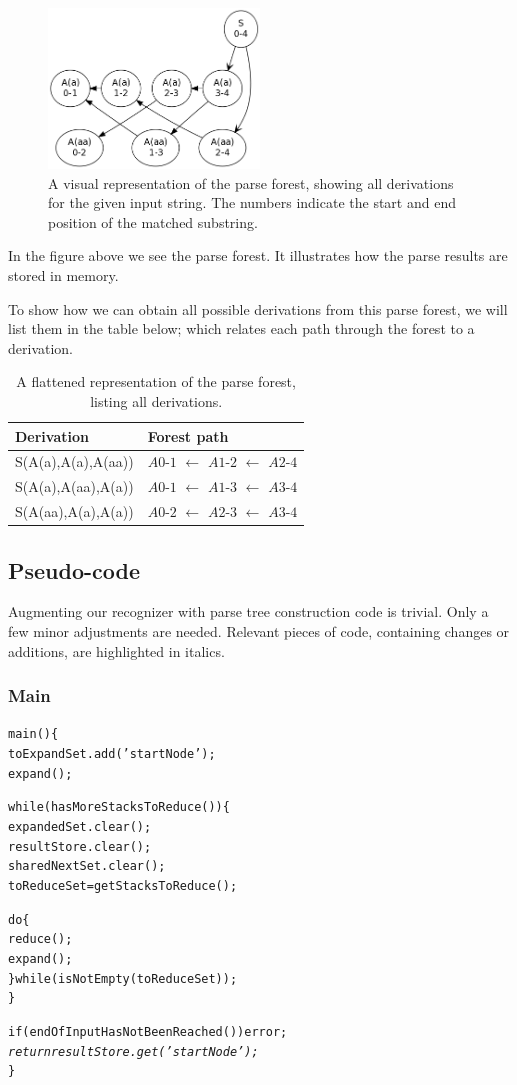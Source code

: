 \documentclass[a4paper,10pt]{article}
\begin{document}
\begin{figure}[H]
\centering
\includegraphics[width=0.5\textwidth]{a_aa-forest.png}
\caption{A visual representation of the parse forest, showing all derivations for the given input string. The numbers indicate the start and end position of the matched substring.}
\end{figure}

In the figure above we see the parse forest. It illustrates how the parse results are stored in memory.

To show how we can obtain all possible derivations from this parse forest, we will list them in the table below; which relates each path through the forest to a derivation.

\begin{table}[H]
\centering
\begin{tabular}{ p{15em} p{15em} }
Derivation & Forest path\\
\hline
S(A(a),A(a),A(aa)) & $A0$-$1$ $\leftarrow$ $A1$-$2$ $\leftarrow$ $A2$-$4$\\
S(A(a),A(aa),A(a)) & $A0$-$1$ $\leftarrow$ $A1$-$3$ $\leftarrow$ $A3$-$4$\\
S(A(aa),A(a),A(a)) & $A0$-$2$ $\leftarrow$ $A2$-$3$ $\leftarrow$ $A3$-$4$
\end{tabular}
\caption{A flattened representation of the parse forest, listing all derivations.}
\end{table}

\pagebreak
\subsection{Pseudo-code}

Augmenting our recognizer with parse tree construction code is trivial. Only a few minor adjustments are needed. Relevant pieces of code, containing changes or additions, are highlighted in italics.

\subsubsection{Main}
{\small
\begin{alltt}
main()\{
  toExpandSet.add('startNode');
  expand();
  
  while(hasMoreStacksToReduce())\{
    expandedSet.clear();
    resultStore.clear();
    sharedNextSet.clear();
    toReduceSet = getStacksToReduce();
    
    do\{
       reduce();
       expand();
    \}while(isNotEmpty(toReduceSet));
  \}
  
  if(endOfInputHasNotBeenReached()) error;
  \textit{
  return resultStore.get('startNode');}
\}
\end{alltt}
}
\end{document}
